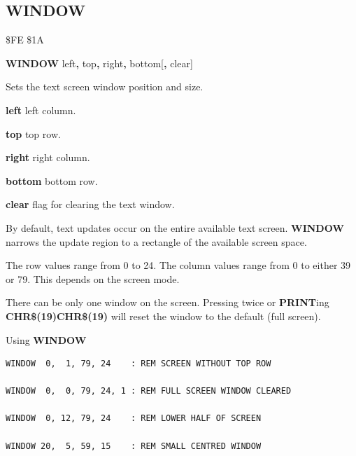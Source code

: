 \subsection{WINDOW}
\begin{description}[leftmargin=2cm,style=nextline]
\item [Token:]    \$FE \$1A

\item [Format:]   {\bf WINDOW} left{\bf,} top{\bf,} right{\bf,} bottom[{\bf,} clear]

\item [Usage:]    Sets the text screen window position and size.

                  {\bf left} left column.

                  {\bf top} top row.

                  {\bf right} right column.

                  {\bf bottom} bottom row.

                  {\bf clear} flag for clearing the text window.

                  By default, text updates occur on the entire available text screen. {\bf WINDOW} narrows the update region to a rectangle of the available screen space.

\item [Remarks:]  The row values range from 0 to 24. The column values range from 0 to either 39 or 79. This depends on the screen mode.

                  There can be only one window on the screen. Pressing  twice or {\bf PRINT}ing {\bf CHR\$(19)CHR\$(19)} will reset the window to the default (full screen).

\item [Examples:] Using {\bf WINDOW}

\begin{tcolorbox}[colback=black,coltext=white]
\verbatimfont{\codefont}
\begin{verbatim}
WINDOW  0,  1, 79, 24    : REM SCREEN WITHOUT TOP ROW

WINDOW  0,  0, 79, 24, 1 : REM FULL SCREEN WINDOW CLEARED

WINDOW  0, 12, 79, 24    : REM LOWER HALF OF SCREEN

WINDOW 20,  5, 59, 15    : REM SMALL CENTRED WINDOW
\end{verbatim}
\end{tcolorbox}
\end{description}

